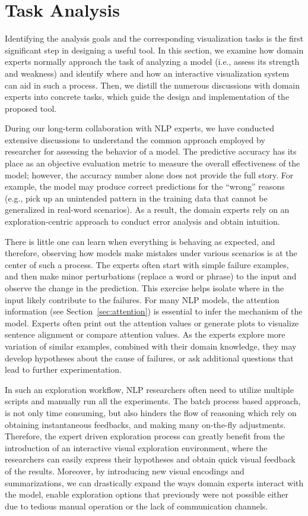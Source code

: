 \section{Task Analysis}
\label{sec:task}
Identifying the analysis goals and the corresponding visualization tasks is the first significant step in designing a useful tool. In this section, we examine how domain experts normally approach the task of analyzing a model (i.e., assess its strength and weakness) and identify where and how an interactive visualization system can aid in such a process.
Then, we distill the numerous discussions with domain experts into concrete tasks, which guide the design and implementation of the proposed tool.

During our long-term collaboration with NLP experts, we have conducted extensive discussions to understand the common approach employed by researcher for assessing the behavior of a model.%
The predictive accuracy has its place as an objective evaluation metric to measure the overall effectiveness of the model; however, the accuracy number alone does not provide the full story.
For example, the model may produce correct predictions for the ``wrong'' reasons (e.g., pick up an unintended pattern in the training data that cannot be generalized in real-word scenarios).
%
As a result, the domain experts rely on an exploration-centric approach to conduct error analysis and obtain intuition.

There is little one can learn when everything is behaving as expected, and therefore,
observing how models make mistakes under various scenarios is at the center of such a process.
The experts often start with simple failure examples, and then make minor perturbations (replace a word or phrase) to the input and observe the change in the prediction. This exercise helps isolate where in the input likely contribute to the failures. For many NLP models, the attention information (see Section~\ref{sec:attention}) is essential to infer the mechanism of the model. Experts often print out the attention values or generate plots to visualize sentence alignment or compare attention values. As the experts explore more variation of similar examples, combined with their domain knowledge, they may develop hypotheses about the cause of failures, or ask additional questions that lead to further experimentation.

In such an exploration workflow, NLP researchers often need to utilize multiple scripts and manually run all the experiments. The batch process based approach, is not only time consuming, but also hinders the flow of reasoning which rely on obtaining instantaneous feedbacks, and making many on-the-fly adjustments.
%
Therefore, the expert driven exploration process can greatly benefit from the introduction of an interactive visual exploration environment, where the researchers can easily express their hypotheses and obtain quick visual feedback of the results.
%
Moreover, by introducing new visual encodings and summarizations, we can drastically expand the ways domain experts interact with the model, enable exploration options that previously were not possible either due to tedious manual operation or the lack of communication channels.

